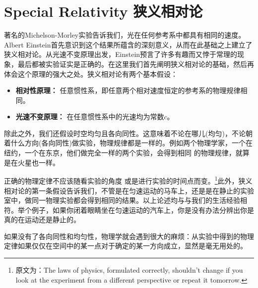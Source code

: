 



\chapter[狭义相对论]{Special Relativity \quad 狭义相对论}
\label{chap2}
 著名的Michelson-Morley实验告诉我们，光在任何参考系中都具有相同的速度。Albert Einstein首先意识到这个结果所蕴含的深刻意义，从而在此基础之上建立了狭义相对论。从光速不变原理出发，Einstein预言了许多有趣而又悖于常理的现象，最后都被实验证实是正确的。在这里我们首先阐明狭义相对论的基础，然后再体会这个原理的强大之处。狭义相对论有两个基本假设：
 \begin{itemize}
   \item {\bf{相对性原理：}} 任意惯性系，即任意两个相对速度恒定的参考系的物理规律相同。
   \item {\bf{光速不变原理：}} 在任意惯性系中的光速均为常数$c$。
 \end{itemize}
除此之外，我们还假设时空均匀且各向同性。这意味着不论在哪儿(均匀)，不论朝着什么方向(各向同性)做实验，物理规律都是一样的。例如两个物理学家，一个在纽约，一个在东京，他们做完全一样的两个实验，会得到相同
  的物理规律，就算是在火星也一样。

正确的物理定律不应该随看实验的角度%
或是进行实验的时间点而变。\footnote{原文为：The laws of physics, formulated correctly, shouldn't change if you look at the experiment from a different perspective or repeat it tomorrow.}此外，狭义相对论的第一条假设告诉我们，不管是在匀速运动的马车上，还是是在静止的实验室中，做同一物理实验都会得到相同的结果。以上论述均与与我们的生活经验相符。举个例子，如果你闭着眼睛坐在匀速运动的汽车上，你是没有办法分辨出你是真的在运动还是静止的。

如果没有了各向同性和均匀性，物理学就会遇到很大的麻烦：从实验中得到的物理定律如果仅仅在空间中的某一点对于确定的某一方向成立，显然是毫无用处的。

